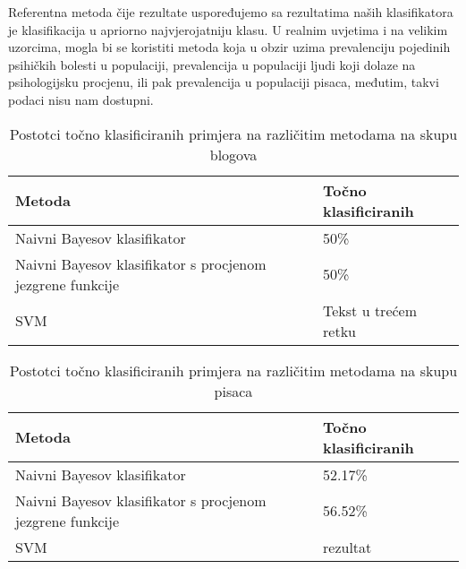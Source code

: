 \documentclass[10pt, a4paper]{article}
\begin{document}
Referentna metoda čije rezultate uspoređujemo sa rezultatima naših klasifikatora je klasifikacija u apriorno najvjerojatniju klasu. U realnim uvjetima i na velikim uzorcima, mogla bi se koristiti metoda koja u obzir uzima prevalenciju pojedinih psihičkih bolesti u populaciji, prevalencija u populaciji ljudi koji dolaze na psihologijsku procjenu, ili pak prevalencija u populaciji pisaca, međutim, takvi podaci nisu nam dostupni.

\begin{table*}
\caption{Postotci točno klasificiranih primjera na različitim metodama na skupu blogova}
\label{tab:rezultati}
\begin{center}
\begin{tabular}{ll}
\toprule
Metoda & Točno klasificiranih \\
\midrule
Naivni Bayesov klasifikator & 50\%\\
Naivni Bayesov klasifikator s procjenom jezgrene funkcije   & 50\%\\
SVM   & Tekst u trećem retku\\
\bottomrule
\end{tabular}
\end{center}
\end{table*}
\begin{table*}
\caption{Postotci točno klasificiranih primjera na različitim metodama na skupu pisaca}
\begin{center}
\begin{tabular}{ll}
\toprule
Metoda & Točno klasificiranih\\
\midrule
Naivni Bayesov klasifikator & 52.17\%\\
Naivni Bayesov klasifikator s procjenom jezgrene funkcije & 56.52\%\\
SVM & rezultat\\
\bottomrule
\end{tabular}
\end{center}
\end{table*}
\end{document}
